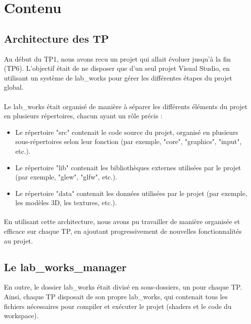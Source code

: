 \documentclass[10pt,a4paper]{article}
\begin{document}
\section{Contenu}

	\subsection{Architecture des TP}
		Au début du TP1, nous avons recu un projet qui allait évoluer jusqu'à la fin (TP6). L'objectif était de ne disposer que d'un seul projet Visual Studio, en utilisant un système de lab\_works pour gérer les différentes étapes du projet global.

		\paragraph{}Le lab\_works était organisé de manière à séparer les différents éléments du projet en plusieurs répertoires, chacun ayant un rôle précis :

		\begin{itemize}
			\item Le répertoire "src" contenait le code source du projet, organisé en plusieurs sous-répertoires selon leur fonction (par exemple, "core", "graphics", "input", etc.).
			\item Le répertoire "lib" contenait les bibliothèques externes utilisées par le projet (par exemple, "glew", "glfw", etc.).
			\item Le répertoire "data" contenait les données utilisées par le projet (par exemple, les modèles 3D, les textures, etc.).
		\end{itemize}

		\paragraph{}En utilisant cette architecture, nous avons pu travailler de manière organisée et efficace sur chaque TP, en ajoutant progressivement de nouvelles fonctionnalités au projet.

	\subsection{Le lab\_works\_manager} %
		En outre, le dossier lab\_works était divisé en sous-dossiers, un pour chaque TP. Ainsi, chaque TP disposait de son propre lab\_works, qui contenait tous les fichiers nécessaires pour compiler et exécuter le projet (shaders et le code du workspace).
\end{document}
